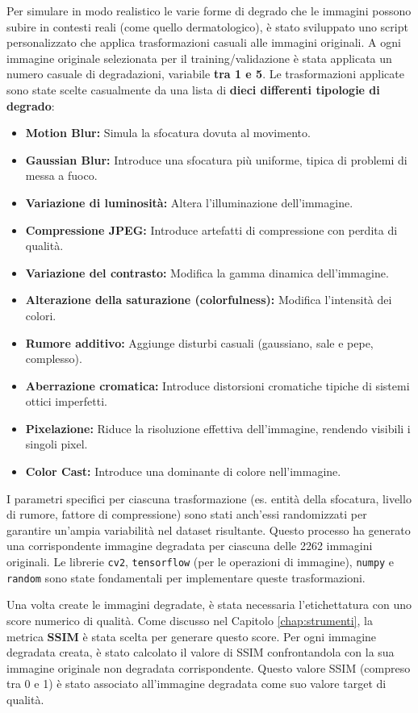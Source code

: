 Per simulare in modo realistico le varie forme di degrado che le immagini possono subire in contesti reali (come quello dermatologico), è stato sviluppato uno script personalizzato che applica trasformazioni casuali alle immagini originali. A ogni immagine originale selezionata per il training/validazione è stata applicata un numero casuale di degradazioni, variabile \textbf{tra 1 e 5}. Le trasformazioni applicate sono state scelte casualmente da una lista di \textbf{dieci differenti tipologie di degrado}:
\begin{itemize}
    \item \textbf{Motion Blur:} Simula la sfocatura dovuta al movimento.
    \item \textbf{Gaussian Blur:} Introduce una sfocatura più uniforme, tipica di problemi di messa a fuoco.
    \item \textbf{Variazione di luminosità:} Altera l'illuminazione dell'immagine.
    \item \textbf{Compressione JPEG:} Introduce artefatti di compressione con perdita di qualità.
    \item \textbf{Variazione del contrasto:} Modifica la gamma dinamica dell'immagine.
    \item \textbf{Alterazione della saturazione (colorfulness):} Modifica l'intensità dei colori.
    \item \textbf{Rumore additivo:} Aggiunge disturbi casuali (gaussiano, sale e pepe, complesso).
    \item \textbf{Aberrazione cromatica:} Introduce distorsioni cromatiche tipiche di sistemi ottici imperfetti.
    \item \textbf{Pixelazione:} Riduce la risoluzione effettiva dell'immagine, rendendo visibili i singoli pixel.
    \item \textbf{Color Cast:} Introduce una dominante di colore nell'immagine.
\end{itemize}
I parametri specifici per ciascuna trasformazione (es. entità della sfocatura, livello di rumore, fattore di compressione) sono stati anch'essi randomizzati per garantire un'ampia variabilità nel dataset risultante. Questo processo ha generato una corrispondente immagine degradata per ciascuna delle 2262 immagini originali. Le librerie \texttt{cv2}, \texttt{tensorflow} (per le operazioni di immagine), \texttt{numpy} e \texttt{random} sono state fondamentali per implementare queste trasformazioni.

Una volta create le immagini degradate, è stata necessaria l'etichettatura con uno score numerico di qualità. Come discusso nel Capitolo \ref{chap:strumenti}, la metrica \textbf{SSIM} è stata scelta per generare questo score. Per ogni immagine degradata creata, è stato calcolato il valore di SSIM confrontandola con la sua immagine originale non degradata corrispondente. Questo valore SSIM (compreso tra 0 e 1) è stato associato all'immagine degradata come suo valore target di qualità.

